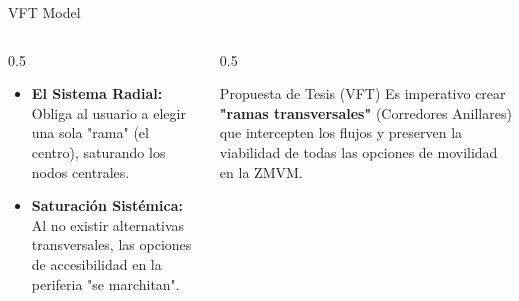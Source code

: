 \begin{frame}{VFT Model}
    \begin{columns}
        \begin{column}{0.5\textwidth}
            \begin{itemize}
                \item \textbf{El Sistema Radial:} Obliga al usuario a elegir una sola "rama" (el centro), saturando los nodos centrales.
                \item \textbf{Saturación Sistémica:} Al no existir alternativas transversales, las opciones de accesibilidad en la periferia "se marchitan".
            \end{itemize}
        \end{column}
        \begin{column}{0.5\textwidth}
            \begin{alertblock}{Propuesta de Tesis (VFT)}
                Es imperativo crear \textbf{"ramas transversales"} (Corredores Anillares) que intercepten los flujos y preserven la viabilidad de todas las opciones de movilidad en la ZMVM.
            \end{alertblock}
        \end{column}
    \end{columns}
\end{frame}